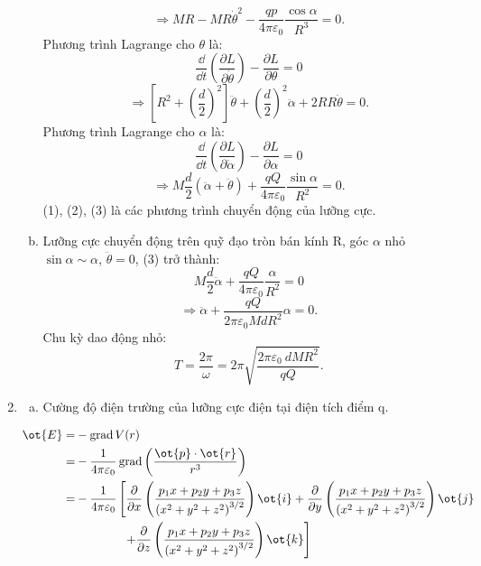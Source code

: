 \begin{loigiai}
\begin{enumerate}[1)]
\begin{enumerate}[a)]
            \[\Rightarrow {MR}-{MR}{{\dot{\theta }}^{2}}-\dfrac{{qp}}{4\pi {{\varepsilon }_{0}}}\dfrac{\cos \alpha }{{{{R}}^{3}}}=0. \tag{1}\]
            Phương trình Lagrange cho $\theta $ là:
            \[\dfrac{{\dd}}{{\dd t}}\left( \dfrac{\partial {L}}{\partial \dot{\theta }} \right)-\dfrac{\partial {L}}{\partial \theta }=0\]\[\Rightarrow \left[ {{{R}}^{2}}+{{\left( \dfrac{{d}}{2} \right)}^{2}} \right]\ddot{\theta }+{{\left( \dfrac{{d}}{2} \right)}^{2}}\ddot{\alpha }+2{RR}\dot{\theta }=0.	\tag{2}\]
            Phương trình Lagrange cho $\alpha $ là:
            \[\dfrac{{\dd}}{{\dd t}}\left( \dfrac{\partial {L}}{\partial \dot{\alpha }} \right)-\dfrac{\partial {L}}{\partial \alpha }=0\]\[\Rightarrow {M}\dfrac{{d}}{2}(\ddot{\alpha }+\ddot{\theta })+\dfrac{{qQ}}{4\pi {{\varepsilon }_{0}}}\dfrac{\sin \alpha }{{{{R}}^{2}}}=0.\tag{3}\]
            (1), (2), (3) là các phương trình chuyển động của lưỡng cực.
            \item Lưỡng cực chuyển động trên quỹ đạo tròn bán kính R, góc $\alpha $ nhỏ $\sin \alpha \sim\alpha$, $\ddot{\theta }=0$,   (3) trở thành: \[{M}\dfrac{{d}}{2}\ddot{\alpha }+\dfrac{{qQ}}{4\pi {{\varepsilon }_{0}}}\dfrac{\alpha }{{{{R}}^{2}}}=0\]\[\Rightarrow \ddot{\alpha }+\dfrac{{qQ}}{2\pi {{\varepsilon }_{0}}{Md}{{{R}}^{2}}}\alpha =0.\]
            Chu kỳ dao động nhỏ: \[{T}=\dfrac{2\pi }{\omega }=2\pi \sqrt{\dfrac{2\pi {{\varepsilon }_{0}}~{dM}{{{R}}^{2}}}{{qQ}}}.\]
        \end{enumerate}
        \item \begin{enumerate}[a)]
            \item Cường độ điện trường của lưỡng cực điện tại điện tích điểm q.
            \end{enumerate}
            \[\begin{aligned}
            \ot{E} =&-\operatorname{grad} {V}({r}) \\
            =&-\frac{1}{4 \pi \varepsilon_{0}} \operatorname{grad}\left(\frac{\ot{{p}} \cdot \ot{r}}{{r}^{3}}\right) \\
            =&-\frac{1}{4 \pi \varepsilon_{0}}\left[\frac{\partial}{\partial {x}}\left(\frac{{p}_{1} {x}+{p}_{2} {y}+{p}_{3} {z}}{\left({x}^{2}+{y}^{2}+{z}^{2}\right)^{3 / 2}}\right) \ot{{i}}+\frac{\partial}{\partial {y}}\left(\frac{{p}_{1} {x}+{p}_{2} {y}+{p}_{3} {z}}{\left({x}^{2}+{y}^{2}+{z}^{2}\right)^{3 / 2}}\right) \ot{{j}}\right.
            \\ &\left.\qquad\qquad+\frac{\partial}{\partial {z}}\left(\frac{{p}_{1} {x}+{p}_{2} {y}+{p}_{3} {z}}{\left({x}^{2}+{y}^{2}+{z}^{2}\right)^{3 / 2}}\right) \ot{{k}}\right]\\

\end{aligned}\]
\end{enumerate}
\end{loigiai}
